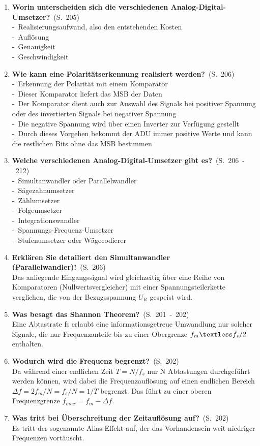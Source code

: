 \documentclass[a4paper,12pt]{article}
\newcommand{\question}[3]{\pagebreak[3]\item {\textbf{#1?}}\ (S.\ #2)#3}
\newcommand{\statement}[3]{\pagebreak[3]\item {\textbf{#1!}}\ (S.\ #2)#3}
\newcommand{\catchword}[1]{\\-\ #1}
\newcommand{\normaltext}[1]{\\#1}
\newcommand{\page}[1]{#1}
\newcommand{\pages}[2]{#1\ -\ #2}
\begin{document}
\begin{enumerate}
  \question{Worin unterscheiden sich die verschiedenen Analog-Digital-Umsetzer}{\page{205}}
  {
    \catchword{Realisierungsaufwand, also den entstehenden Kosten}
    \catchword{Auflösung}
    \catchword{Genauigkeit}
    \catchword{Geschwindigkeit}
  }

  \question{Wie kann eine Polaritätserkennung realisiert werden}{\page{206}}
  {
    \catchword{Erkennung der Polarität mit einem Komparator}
    \catchword{Dieser Komparator liefert das MSB der Daten}
    \catchword{Der Komparator dient auch zur Auswahl des Signals bei positiver Spannung
               oder des invertierten Signals bei negativer Spannung}
    \catchword{Die negative Spannung wird über einen Inverter zur Verfügung gestellt}
    \catchword{Durch dieses Vorgehen bekommt der ADU immer positive Werte und kann die
               restlichen Bits ohne das MSB bestimmen}
  }

  \question{Welche verschiedenen Analog-Digital-Umsetzer gibt es}{\pages{206}{212}}
  {
    \catchword{Simultanwandler oder Parallelwandler}
    \catchword{Sägezahnumsetzer}
    \catchword{Zählumsetzer}
    \catchword{Folgeumsetzer}
    \catchword{Integrationswandler}
    \catchword{Spannungs-Frequenz-Umsetzer}
    \catchword{Stufenumsetzer oder Wägecodierer}
  }

  \statement{Erklären Sie detailiert den Simultanwandler (Parallelwandler)}{\page{206}}
  {
    \normaltext{Das anliegende Eingangssignal wird gleichzeitig über eine Reihe von Komparatoren
                (Nullwertsvergleicher) mit einer Spannungsteilerkette verglichen, die von der
                Bezugsspannung $U_R$ gespeist wird.}
  }

  \question{Was besagt das Shannon Theorem}{\pages{201}{202}}
  {
    \normaltext{Eine Abtastrate fs erlaubt eine informationsgetreue Umwandlung nur solcher Signale, die
    nur Frequenzanteile bis zu einer Obergrenze $  f_m\textless f_s/2 $ enthalten.}
  }

  \question{Wodurch wird die Frequenz begrenzt}{\page{202}}
  {
    \normaltext{Da während einer endlichen Zeit $ T = N/f_s $  nur N Abtastungen durchgeführt werden können,
    wird dabei die Frequenzauflösung auf einen endlichen Bereich $ \Delta f = 2f_m/N = f_s/N = 1/T $ begrenzt.
    Das führt zu einer oberen Frequenzgrenze $ f_{max} = f_m - \Delta f $.  }
  }

  \question{Was tritt bei Überschreitung der Zeitauflösung auf}{\page{202}}
  {
    \normaltext{Es tritt der sogenannte Alias-Effekt auf, der das Vorhandensein weit niedriger Frequenzen
    vortäuscht.}
  }


\end{enumerate}
\end{document}
